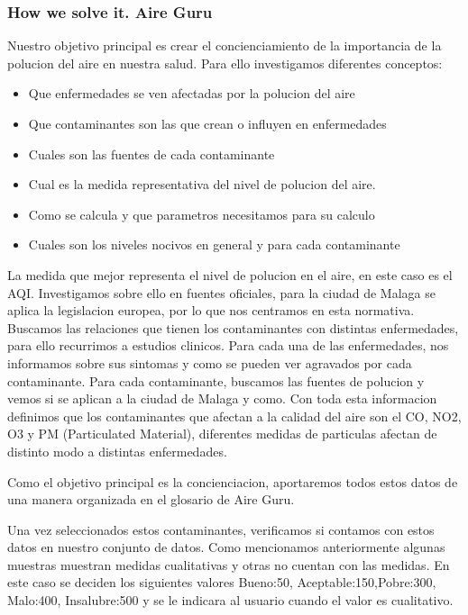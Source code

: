 \subsubsection{How we solve it. Aire Guru} 
Nuestro objetivo principal es crear el concienciamiento de la importancia de la polucion del aire en nuestra salud. Para ello investigamos diferentes conceptos:
\begin{itemize}
    \item Que enfermedades se ven afectadas por la polucion del aire
    \item Que contaminantes son las que crean o influyen en enfermedades
    \item Cuales son las fuentes de cada contaminante
    \item Cual es la medida representativa del nivel de polucion del aire.
    \item Como se calcula y que parametros necesitamos para su calculo
    \item Cuales son los niveles nocivos en general y para cada contaminante
\end{itemize}
La medida que mejor representa el nivel de polucion en el aire, en este caso es el AQI. Investigamos sobre ello en fuentes oficiales, para la ciudad de Malaga se aplica la 
legislacion europea, por lo que nos centramos en esta normativa.
Buscamos las relaciones que tienen los contaminantes con distintas enfermedades, para ello recurrimos a estudios clinicos. Para cada una de las enfermedades, nos informamos
sobre sus sintomas y como se pueden ver agravados por cada contaminante.
Para cada contaminante, buscamos las fuentes de polucion y vemos si se aplican a la ciudad de Malaga y como.
Con toda esta informacion definimos que los contaminantes que afectan a la calidad del aire son el CO, NO2, O3 y PM (Particulated Material), diferentes medidas de particulas
afectan de distinto modo a distintas enfermedades.

Como el objetivo principal es la concienciacion, aportaremos todos estos datos de una manera organizada en el glosario de Aire Guru.

Una vez seleccionados estos contaminantes, verificamos si contamos con estos datos en nuestro conjunto de datos. Como mencionamos anteriormente algunas muestras
muestran medidas cualitativas y otras no cuentan con las medidas. En este caso se deciden los siguientes valores Bueno:50, Aceptable:150,Pobre:300, Malo:400, Insalubre:500
y se le indicara al usuario cuando el valor es cualitativo.



